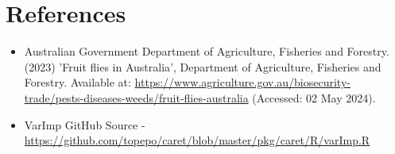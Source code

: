 \documentclass{article}
\begin{document}
\newpage
\section{References}

\begin{itemize}
    \item Australian Government Department of Agriculture, Fisheries and Forestry. (2023) 'Fruit flies in Australia', Department of Agriculture, Fisheries and Forestry. Available at: \href{https://www.agriculture.gov.au/biosecurity-trade/pests-diseases-weeds/fruit-flies-australia}{https://www.agriculture.gov.au/biosecurity-trade/pests-diseases-weeds/fruit-flies-australia} (Accessed: 02 May 2024).
    \item VarImp GitHub Source - \href{https://github.com/topepo/caret/blob/master/pkg/caret/R/varImp.R}{https://github.com/topepo/caret/blob/master/pkg/caret/R/varImp.R}
\end{itemize}
\end{document}
